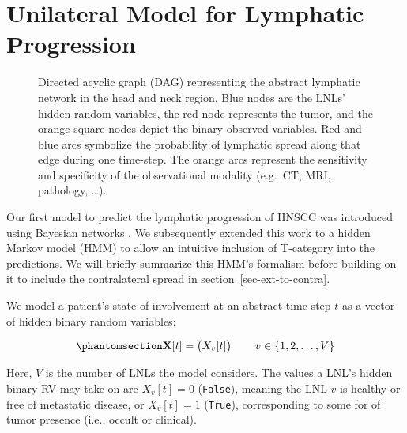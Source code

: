 \documentclass[
  sn-mathphys-num,
]{sn-jnl}
\begin{document}
\section{Unilateral Model for Lymphatic
Progression}\label{sec-unilateral}

\begin{figure}


\caption{\label{fig-small-graph}Directed acyclic graph (DAG)
representing the abstract lymphatic network in the head and neck region.
Blue nodes are the LNLs' hidden random variables, the red node
represents the tumor, and the orange square nodes depict the binary
observed variables. Red and blue arcs symbolize the probability of
lymphatic spread along that edge during one time-step. The orange arcs
represent the sensitivity and specificity of the observational modality
(e.g.~CT, MRI, pathology, \ldots).}

\end{figure}%

Our first model to predict the lymphatic progression of HNSCC was
introduced using Bayesian networks \citep{pouymayou_bayesian_2019}. We
subsequently extended this work to a hidden Markov model (HMM)
\citep{ludwig_hidden_2021} to allow an intuitive inclusion of T-category
into the predictions. We will briefly summarize this HMM's formalism
before building on it to include the contralateral spread in
section~\ref{sec-ext-to-contra}.

We model a patient's state of involvement at an abstract time-step \(t\)
as a vector of hidden binary random variables:

\begin{equation}\phantomsection\label{eq-state-def}{
\mathbf{X}[t] = \begin{pmatrix} X_v[t] \end{pmatrix} \qquad v \in \left\{ 1, 2, \ldots, V \right\}
}\end{equation}

Here, \(V\) is the number of LNLs the model considers. The values a
LNL's hidden binary RV may take on are \(X_v[t] = 0\) (\texttt{False}),
meaning the LNL \(v\) is healthy or free of metastatic disease, or
\(X_v[t] = 1\) (\texttt{True}), corresponding to some for of tumor
presence (i.e., occult or clinical).
\end{document}
